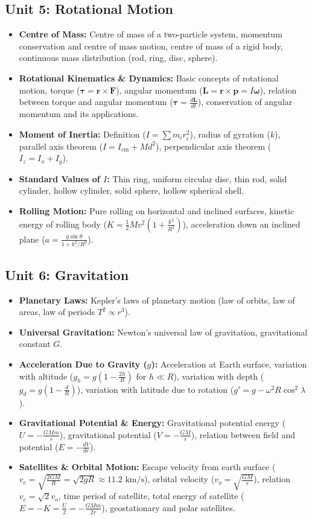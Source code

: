 \documentclass[11pt,a4paper]{article}
\begin{document}
\subsection{Unit 5: Rotational Motion}
\begin{itemize}
  \item \textbf{Centre of Mass:} Centre of mass of a two-particle system, momentum conservation and centre of mass motion, centre of mass of a rigid body, continuous mass distribution (rod, ring, disc, sphere).
  \item \textbf{Rotational Kinematics \& Dynamics:} Basic concepts of rotational motion, torque ($\boldsymbol{\tau} = \mathbf{r}\times\mathbf{F}$), angular momentum ($\mathbf{L} = \mathbf{r}\times\mathbf{p} = I\boldsymbol{\omega}$), relation between torque and angular momentum ($\boldsymbol{\tau} = \frac{d\mathbf{L}}{dt}$), conservation of angular momentum and its applications.
  \item \textbf{Moment of Inertia:} Definition ($I = \sum m_i r_i^2$), radius of gyration ($k$), parallel axis theorem ($I = I_{\text{cm}} + Md^2$), perpendicular axis theorem ($I_z = I_x + I_y$).
  \item \textbf{Standard Values of $I$:} Thin ring, uniform circular disc, thin rod, solid cylinder, hollow cylinder, solid sphere, hollow spherical shell.
  \item \textbf{Rolling Motion:} Pure rolling on horizontal and inclined surfaces, kinetic energy of rolling body ($K = \frac{1}{2}Mv^2(1 + \frac{k^2}{R^2})$), acceleration down an inclined plane ($a = \frac{g\sin\theta}{1 + k^2/R^2}$).
\end{itemize}

\subsection{Unit 6: Gravitation}
\begin{itemize}
  \item \textbf{Planetary Laws:} Kepler's laws of planetary motion (law of orbits, law of areas, law of periods $T^2 \propto r^3$).
  \item \textbf{Universal Gravitation:} Newton's universal law of gravitation, gravitational constant $G$.
  \item \textbf{Acceleration Due to Gravity ($g$):} Acceleration at Earth surface, variation with altitude ($g_h = g(1-\frac{2h}{R})$ for $h \ll R$), variation with depth ($g_d = g(1-\frac{d}{R})$), variation with latitude due to rotation ($g' = g - \omega^2 R \cos^2\lambda$).
  \item \textbf{Gravitational Potential \& Energy:} Gravitational potential energy ($U = -\frac{GMm}{r}$), gravitational potential ($V = -\frac{GM}{r}$), relation between field and potential ($E = -\frac{dV}{dr}$).
  \item \textbf{Satellites \& Orbital Motion:} Escape velocity from earth surface ($v_e = \sqrt{\frac{2GM}{R}} = \sqrt{2gR} \approx 11.2\text{ km/s}$), orbital velocity ($v_o = \sqrt{\frac{GM}{r}}$), relation $v_e = \sqrt{2}v_o$, time period of satellite, total energy of satellite ($E = -K = \frac{U}{2} = -\frac{GMm}{2r}$), geostationary and polar satellites.
\end{itemize}
\end{document}
